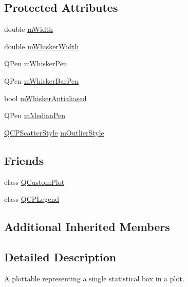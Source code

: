 \subsection*{Protected Attributes}
\begin{DoxyCompactItemize}
\item 
double \mbox{\hyperlink{class_q_c_p_statistical_box_af365e40b0f706c3d76f857c7957f629d}{m\+Width}}
\item 
double \mbox{\hyperlink{class_q_c_p_statistical_box_a4d166474f845d5db626e8b11a0815a6f}{m\+Whisker\+Width}}
\item 
Q\+Pen \mbox{\hyperlink{class_q_c_p_statistical_box_a25b7552499f0f090fcff02858b2265a5}{m\+Whisker\+Pen}}
\item 
Q\+Pen \mbox{\hyperlink{class_q_c_p_statistical_box_aa719b1d722a9f82364df1497a6dc1da8}{m\+Whisker\+Bar\+Pen}}
\item 
bool \mbox{\hyperlink{class_q_c_p_statistical_box_a714bb91efb423c7b7ec3a6a50c2910b9}{m\+Whisker\+Antialiased}}
\item 
Q\+Pen \mbox{\hyperlink{class_q_c_p_statistical_box_a1af5b601049c575f778ae270f40c9443}{m\+Median\+Pen}}
\item 
\mbox{\hyperlink{class_q_c_p_scatter_style}{Q\+C\+P\+Scatter\+Style}} \mbox{\hyperlink{class_q_c_p_statistical_box_ae102e4187e1e6ba1f2df0f622b5171a4}{m\+Outlier\+Style}}
\end{DoxyCompactItemize}
\subsection*{Friends}
\begin{DoxyCompactItemize}
\item 
class \mbox{\hyperlink{class_q_c_p_statistical_box_a1cdf9df76adcfae45261690aa0ca2198}{Q\+Custom\+Plot}}
\item 
class \mbox{\hyperlink{class_q_c_p_statistical_box_a8429035e7adfbd7f05805a6530ad5e3b}{Q\+C\+P\+Legend}}
\end{DoxyCompactItemize}
\subsection*{Additional Inherited Members}


\subsection{Detailed Description}
A plottable representing a single statistical box in a plot. 



